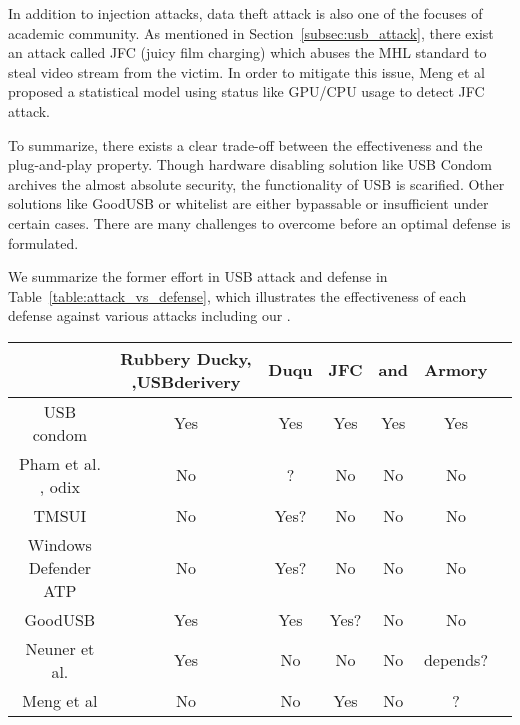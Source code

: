 In addition to injection attacks, data theft attack is also one of the focuses of academic community. As mentioned in Section~\ref{subsec:usb_attack}, there exist an attack called JFC (juicy film charging)\cite{JFC} which abuses the MHL standard to steal video stream from the victim. In order to mitigate this issue, Meng et al proposed a statistical model using status like GPU/CPU usage to detect JFC attack\cite{meng2018252}.

To summarize, there exists a clear trade-off between the effectiveness and the plug-and-play property. Though hardware disabling solution like USB Condom archives the almost absolute security, the functionality of USB is scarified. Other solutions like GoodUSB or whitelist are either bypassable or insufficient under certain cases. There are many challenges to overcome before an optimal defense is formulated.

We summarize the former effort in USB attack and defense in Table~\ref{table:attack_vs_defense}, which illustrates the effectiveness of each defense against various attacks including our \tool.
\begin{table*}
	\centering
	\begin{tabular}{|c|c|c|c|c|c|c|}
		
		
		\hline
		\diagbox {Defence}{Attack} & Rubbery Ducky\cite{rubber}, \cite{rubberducky2020},USBderivery\cite{usbdriver} & Duqu\cite{duqu} & JFC\cite{JFCImpact}&\cite{smartphone}\cite{poweremi} and \cite{usbdriver}& Armory\\
		
		\hline 
		USB condom \cite{Condom}& Yes & Yes & Yes & Yes & Yes\\
		\hline 
		Pham et al. \cite{pham2010optimizing}, odix\cite{OLEA}& No & ? & No & No & No\\
		\hline 
		TMSUI\cite{yang2015tmsui}& No & Yes? & No & No & No\\
		\hline 
		Windows Defender ATP\cite{windenfenderwhite}& No & Yes? & No & No & No\\
		\hline 
		GoodUSB\cite{tian2015defending}& Yes & Yes & Yes? & No & No \\

		\hline
		Neuner et al.\cite{neuner2018usblock}& Yes & No & No & No & depends? \\
		\hline
		Meng et al\cite{meng2018252}& No & No & Yes & No & ?\\
		\hline
	\end{tabular}
	\linebreak
	\caption{Effectiveness of defense against different attacks}
	\label{table:attack_vs_defense}
\end{table*}




